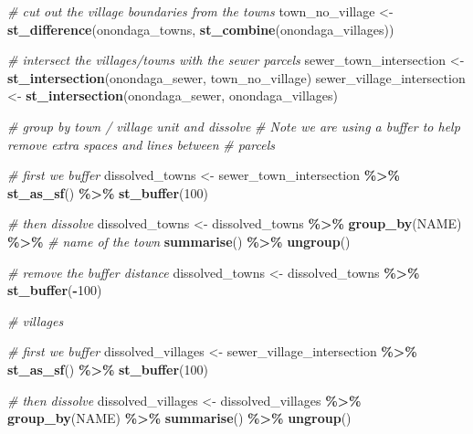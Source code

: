 \documentclass[
]{book}
\newenvironment{Shaded}{\begin{snugshade}}{\end{snugshade}}
\newcommand{\CommentTok}[1]{\textcolor[rgb]{0.56,0.35,0.01}{\textit{#1}}}
\newcommand{\DecValTok}[1]{\textcolor[rgb]{0.00,0.00,0.81}{#1}}
\newcommand{\FunctionTok}[1]{\textcolor[rgb]{0.13,0.29,0.53}{\textbf{#1}}}
\newcommand{\NormalTok}[1]{#1}
\newcommand{\OtherTok}[1]{\textcolor[rgb]{0.56,0.35,0.01}{#1}}
\newcommand{\SpecialCharTok}[1]{\textcolor[rgb]{0.81,0.36,0.00}{\textbf{#1}}}
\begin{document}
\begin{Shaded}
\begin{Highlighting}[]
\CommentTok{\# cut out the village boundaries from the towns}
\NormalTok{town\_no\_village }\OtherTok{\textless{}{-}}\FunctionTok{st\_difference}\NormalTok{(onondaga\_towns, }\FunctionTok{st\_combine}\NormalTok{(onondaga\_villages))}

\CommentTok{\# intersect the villages/towns with the sewer parcels}
\NormalTok{sewer\_town\_intersection }\OtherTok{\textless{}{-}} \FunctionTok{st\_intersection}\NormalTok{(onondaga\_sewer, town\_no\_village)}
\NormalTok{sewer\_village\_intersection }\OtherTok{\textless{}{-}} \FunctionTok{st\_intersection}\NormalTok{(onondaga\_sewer, onondaga\_villages)}

\CommentTok{\# group by town / village unit and dissolve}
\CommentTok{\# Note we are using a buffer to help remove extra spaces and lines between }
\CommentTok{\# parcels}

\CommentTok{\# first we buffer}
\NormalTok{dissolved\_towns }\OtherTok{\textless{}{-}}\NormalTok{ sewer\_town\_intersection }\SpecialCharTok{\%\textgreater{}\%}
  \FunctionTok{st\_as\_sf}\NormalTok{() }\SpecialCharTok{\%\textgreater{}\%}
  \FunctionTok{st\_buffer}\NormalTok{(}\DecValTok{100}\NormalTok{)}

\CommentTok{\# then dissolve}
\NormalTok{dissolved\_towns }\OtherTok{\textless{}{-}}\NormalTok{ dissolved\_towns }\SpecialCharTok{\%\textgreater{}\%} 
  \FunctionTok{group\_by}\NormalTok{(NAME) }\SpecialCharTok{\%\textgreater{}\%} \CommentTok{\# name of the town}
  \FunctionTok{summarise}\NormalTok{() }\SpecialCharTok{\%\textgreater{}\%}
  \FunctionTok{ungroup}\NormalTok{()}

\CommentTok{\# remove the buffer distance}
\NormalTok{dissolved\_towns }\OtherTok{\textless{}{-}}\NormalTok{ dissolved\_towns }\SpecialCharTok{\%\textgreater{}\%}
  \FunctionTok{st\_buffer}\NormalTok{(}\SpecialCharTok{{-}}\DecValTok{100}\NormalTok{) }

\CommentTok{\# villages}

\CommentTok{\# first we buffer}
\NormalTok{dissolved\_villages }\OtherTok{\textless{}{-}}\NormalTok{ sewer\_village\_intersection }\SpecialCharTok{\%\textgreater{}\%}
  \FunctionTok{st\_as\_sf}\NormalTok{() }\SpecialCharTok{\%\textgreater{}\%}
  \FunctionTok{st\_buffer}\NormalTok{(}\DecValTok{100}\NormalTok{)}

\CommentTok{\# then dissolve}
\NormalTok{dissolved\_villages }\OtherTok{\textless{}{-}}\NormalTok{ dissolved\_villages }\SpecialCharTok{\%\textgreater{}\%} 
  \FunctionTok{group\_by}\NormalTok{(NAME) }\SpecialCharTok{\%\textgreater{}\%}
  \FunctionTok{summarise}\NormalTok{() }\SpecialCharTok{\%\textgreater{}\%}
  \FunctionTok{ungroup}\NormalTok{()}


\end{Highlighting}
\end{Shaded}
\end{document}
